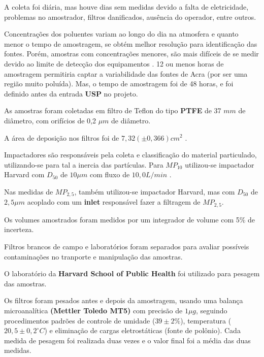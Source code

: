 A coleta foi diária, mas houve dias sem medidas devido a falta de eletricidade,
problemas no amostrador, filtros danificados, ausência do operador, entre outros. 

Concentrações dos poluentes variam ao longo do dia na atmosfera
e quanto menor o tempo de amostragem, se obtém melhor resolução 
para identificação das fontes. Porém, amostras com concentrações menores, 
são mais difíceis de se medir devido ao limite de detecção dos equipamentos
\citep{calzolai2015}. 12 ou menos horas de amostragem permitiria captar 
a variabilidade das fontes de Acra (por ser uma região muito poluída).
Mas, o tempo de amostragem foi de 48 horas, e foi definido antes da 
entrada \textbf{USP} no projeto.

As amostras  foram coletadas em filtro de Teflon do tipo 
\textbf{PTFE} de 37 $mm$ de diâmetro, com orifícios de 0,2 $\mu m$ de diâmetro. 

A área de deposição nos filtros foi de $7,32 (\pm 0,366) cm^2$ .

Impactadores são responsáveis pela coleta e classificação 
do material particulado, utilizando-se para tal a inercia das
partículas.
Para $MP_{10}$ utilizou-se impactador Harvard com $D_{50}$ de $10 \mu m$ 
com fluxo de $10,0 L/min$ \citep{marple1987}. 

Nas medidas de $MP_{2,5}$, também utilizou-se impactador Harvard, 
mas com $D_{50}$ de $2,5 \mu m$ acoplado com um \textbf{inlet} 
responsável fazer a filtragem de $MP_{2,5}$.

Os volumes amostrados foram medidos por um integrador de volume
com 5\% de incerteza.

Filtros brancos de campo e laboratórios foram separados para avaliar 
possíveis contaminações no tranporte e manipulação das amostras. 

O laboratório da \textbf{Harvard School of Public Health} foi
utilizado para pesagem das amostras.

Os filtros foram pesados antes e depois da amostragem, usando uma balança 
microanalítica \textbf{(Mettler Toledo MT5)} com precisão de $1 \mu g$, 
seguindo procedimentos padrões de controle de umidade ($39 \pm 2 \%$), 
temperatura ($20,5 \pm 0,2 ^{\circ} C$) e eliminação de cargas eletrostáticas 
(fonte de polônio). 
Cada medida de pesagem foi realizada duas vezes e o valor final foi a média das 
duas medidas. 
